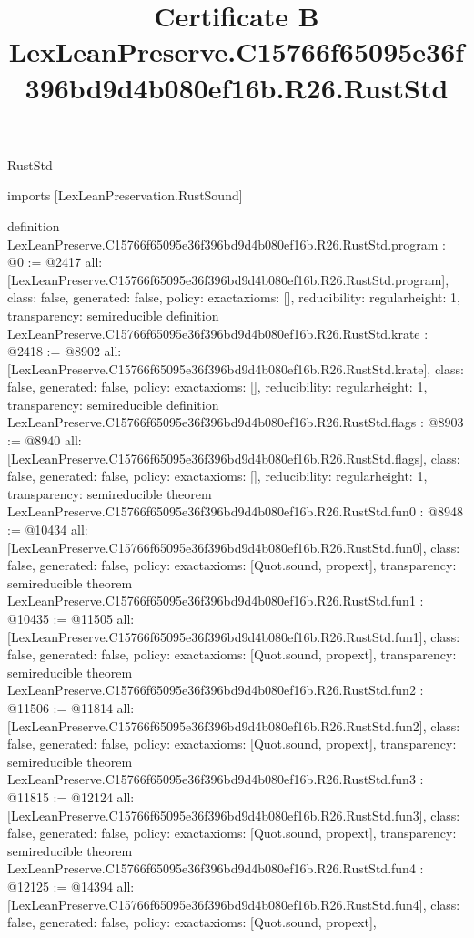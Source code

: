 \begin{lexlean}{RustStd}
\title{Certificate B LexLeanPreserve.C15766f65095e36f396bd9d4b080ef16b.R26.RustStd}
\begin{coremodule}
imports [LexLeanPreservation.RustSound]

definition LexLeanPreserve.C15766f65095e36f396bd9d4b080ef16b.R26.RustStd.program : @0 := @2417 {
  all: [LexLeanPreserve.C15766f65095e36f396bd9d4b080ef16b.R26.RustStd.program],
  class: false,
  generated: false,
  policy: exact{axioms: []},
  reducibility: regular{height: 1},
  transparency: semireducible
}
definition LexLeanPreserve.C15766f65095e36f396bd9d4b080ef16b.R26.RustStd.krate : @2418 := @8902 {
  all: [LexLeanPreserve.C15766f65095e36f396bd9d4b080ef16b.R26.RustStd.krate],
  class: false,
  generated: false,
  policy: exact{axioms: []},
  reducibility: regular{height: 1},
  transparency: semireducible
}
definition LexLeanPreserve.C15766f65095e36f396bd9d4b080ef16b.R26.RustStd.flags : @8903 := @8940 {
  all: [LexLeanPreserve.C15766f65095e36f396bd9d4b080ef16b.R26.RustStd.flags],
  class: false,
  generated: false,
  policy: exact{axioms: []},
  reducibility: regular{height: 1},
  transparency: semireducible
}
theorem LexLeanPreserve.C15766f65095e36f396bd9d4b080ef16b.R26.RustStd.fun0 : @8948 := @10434 {
  all: [LexLeanPreserve.C15766f65095e36f396bd9d4b080ef16b.R26.RustStd.fun0],
  class: false,
  generated: false,
  policy: exact{axioms: [Quot.sound, propext]},
  transparency: semireducible
}
theorem LexLeanPreserve.C15766f65095e36f396bd9d4b080ef16b.R26.RustStd.fun1 : @10435 := @11505 {
  all: [LexLeanPreserve.C15766f65095e36f396bd9d4b080ef16b.R26.RustStd.fun1],
  class: false,
  generated: false,
  policy: exact{axioms: [Quot.sound, propext]},
  transparency: semireducible
}
theorem LexLeanPreserve.C15766f65095e36f396bd9d4b080ef16b.R26.RustStd.fun2 : @11506 := @11814 {
  all: [LexLeanPreserve.C15766f65095e36f396bd9d4b080ef16b.R26.RustStd.fun2],
  class: false,
  generated: false,
  policy: exact{axioms: [Quot.sound, propext]},
  transparency: semireducible
}
theorem LexLeanPreserve.C15766f65095e36f396bd9d4b080ef16b.R26.RustStd.fun3 : @11815 := @12124 {
  all: [LexLeanPreserve.C15766f65095e36f396bd9d4b080ef16b.R26.RustStd.fun3],
  class: false,
  generated: false,
  policy: exact{axioms: [Quot.sound, propext]},
  transparency: semireducible
}
theorem LexLeanPreserve.C15766f65095e36f396bd9d4b080ef16b.R26.RustStd.fun4 : @12125 := @14394 {
  all: [LexLeanPreserve.C15766f65095e36f396bd9d4b080ef16b.R26.RustStd.fun4],
  class: false,
  generated: false,
  policy: exact{axioms: [Quot.sound, propext]},
}
\end{coremodule}
\end{lexlean}
